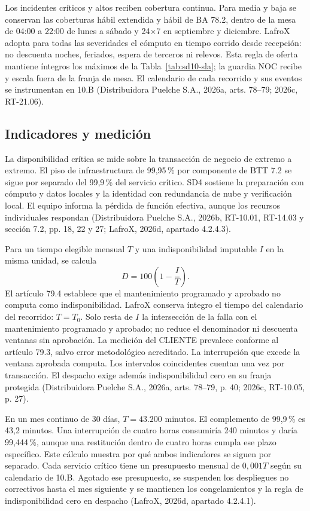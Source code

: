 Los incidentes críticos y altos reciben cobertura continua. Para media y baja se conservan las coberturas hábil extendida y hábil de BA 78.2, dentro de la mesa de 04:00 a 22:00 de lunes a sábado y 24$\times$7 en septiembre y diciembre. LafroX adopta para todas las severidades el cómputo en tiempo corrido desde recepción: no descuenta noches, feriados, espera de terceros ni relevos. Esta regla de oferta mantiene íntegros los máximos de la Tabla~\ref{tab:sd10-sla}; la guardia NOC recibe y escala fuera de la franja de mesa. El calendario de cada recorrido y sus eventos se instrumentan en 10.B (Distribuidora Puelche S.A., 2026a, arts. 78--79; 2026c, RT-21.06).

\subsection{Indicadores y medición}
\label{sub:sd10-medicion}

La disponibilidad crítica se mide sobre la transacción de negocio de extremo a extremo. El piso de infraestructura de 99,95\,\% por componente de BTT 7.2 se sigue por separado del 99,9\,\% del servicio crítico. SD4 sostiene la preparación con cómputo y datos locales y la identidad con redundancia de nube y verificación local. El equipo informa la pérdida de función efectiva, aunque los recursos individuales respondan (Distribuidora Puelche S.A., 2026b, RT-10.01, RT-14.03 y sección 7.2, pp. 18, 22 y 27; LafroX, 2026d, apartado 4.2.4.3).

Para un tiempo elegible mensual $T$ y una indisponibilidad imputable $I$ en la misma unidad, se calcula
\[
 D=100\left(1-\frac{I}{T}\right).
\]
El artículo 79.4 establece que el mantenimiento programado y aprobado no computa como indisponibilidad. LafroX conserva íntegro el tiempo del calendario del recorrido: $T=T_0$. Solo resta de $I$ la intersección de la falla con el mantenimiento programado y aprobado; no reduce el denominador ni descuenta ventanas sin aprobación. La medición del CLIENTE prevalece conforme al artículo 79.3, salvo error metodológico acreditado. La interrupción que excede la ventana aprobada computa. Los intervalos coincidentes cuentan una vez por transacción. El despacho exige además indisponibilidad cero en su franja protegida (Distribuidora Puelche S.A., 2026a, arts. 78--79, p. 40; 2026c, RT-10.05, p. 27).

En un mes continuo de 30 días, $T=\text{43.200}$ minutos. El complemento de 99,9\,\% es 43,2 minutos. Una interrupción de cuatro horas consumiría 240 minutos y daría 99,444\,\%, aunque una restitución dentro de cuatro horas cumpla ese plazo específico. Este cálculo muestra por qué ambos indicadores se siguen por separado. Cada servicio crítico tiene un presupuesto mensual de $0{,}001T$ según su calendario de 10.B. Agotado ese presupuesto, se suspenden los despliegues no correctivos hasta el mes siguiente y se mantienen los congelamientos y la regla de indisponibilidad cero en despacho (LafroX, 2026d, apartado 4.2.4.1).


